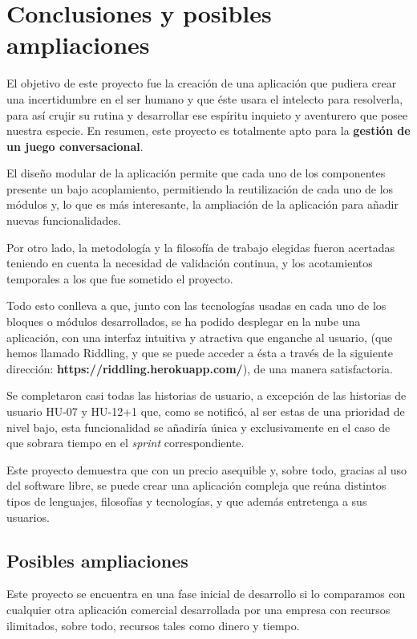 \chapter{Conclusiones y posibles ampliaciones}

El objetivo de este proyecto fue la creación de una aplicación que pudiera crear una incertidumbre en el ser humano y que éste usara el intelecto para resolverla, para así crujir su rutina y desarrollar ese espíritu inquieto y aventurero que posee nuestra especie. En resumen, este proyecto es totalmente apto para la \textbf{gestión de un juego conversacional}. 

El diseño modular de la aplicación permite que cada uno de los componentes presente un bajo acoplamiento, permitiendo la reutilización de cada uno de los módulos y, lo que es más interesante, la ampliación de la aplicación para añadir nuevas funcionalidades. 

Por otro lado, la metodología y la filosofía de trabajo elegidas fueron acertadas teniendo en cuenta la necesidad de validación continua, y los acotamientos temporales a los que fue sometido el proyecto.

Todo esto conlleva a que, junto con las tecnologías usadas en cada uno de los bloques o módulos desarrollados, se ha podido desplegar en la nube una aplicación, con una interfaz intuitiva y atractiva que enganche al usuario, (que hemos llamado Riddling, y que se puede acceder a ésta a través de la siguiente dirección: \textbf{https://riddling.herokuapp.com/}), de una manera satisfactoria.

Se completaron casi todas las historias de usuario, a excepción de las historias de usuario HU-07 y HU-12+1 que, como se notificó, al ser estas de una prioridad de nivel bajo, esta funcionalidad se añadiría única y exclusivamente en el caso de que sobrara tiempo en el \textit{sprint} correspondiente.

Este proyecto demuestra que con un precio asequible y, sobre todo, gracias al uso del software libre, se puede crear una aplicación compleja que reúna distintos tipos de lenguajes, filosofías y tecnologías, y que además entretenga a sus usuarios.

\section{Posibles ampliaciones}

Este proyecto se encuentra en una fase inicial de desarrollo si lo comparamos con cualquier otra aplicación comercial desarrollada por una empresa con recursos ilimitados, sobre todo, recursos tales como dinero y tiempo.

